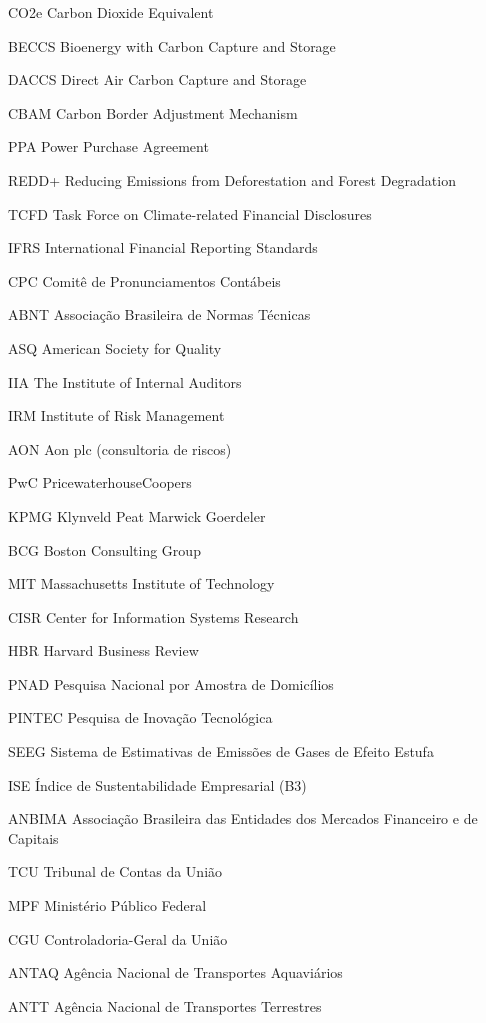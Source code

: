 \begin{siglas}
\item[CO2e] Carbon Dioxide Equivalent
\item[BECCS] Bioenergy with Carbon Capture and Storage
\item[DACCS] Direct Air Carbon Capture and Storage
\item[CBAM] Carbon Border Adjustment Mechanism
\item[PPA] Power Purchase Agreement
\item[REDD+] Reducing Emissions from Deforestation and Forest Degradation
\item[TCFD] Task Force on Climate-related Financial Disclosures
\item[IFRS] International Financial Reporting Standards
\item[CPC] Comitê de Pronunciamentos Contábeis
\item[ABNT] Associação Brasileira de Normas Técnicas
\item[ASQ] American Society for Quality
\item[IIA] The Institute of Internal Auditors
\item[IRM] Institute of Risk Management
\item[AON] Aon plc (consultoria de riscos)
\item[PwC] PricewaterhouseCoopers
\item[KPMG] Klynveld Peat Marwick Goerdeler
\item[BCG] Boston Consulting Group
\item[MIT] Massachusetts Institute of Technology
\item[CISR] Center for Information Systems Research
\item[HBR] Harvard Business Review
\item[PNAD] Pesquisa Nacional por Amostra de Domicílios
\item[PINTEC] Pesquisa de Inovação Tecnológica
\item[SEEG] Sistema de Estimativas de Emissões de Gases de Efeito Estufa
\item[ISE] Índice de Sustentabilidade Empresarial (B3)
\item[ANBIMA] Associação Brasileira das Entidades dos Mercados Financeiro e de Capitais
\item[TCU] Tribunal de Contas da União
\item[MPF] Ministério Público Federal
\item[CGU] Controladoria-Geral da União
\item[ANTAQ] Agência Nacional de Transportes Aquaviários
\item[ANTT] Agência Nacional de Transportes Terrestres

\end{siglas}
